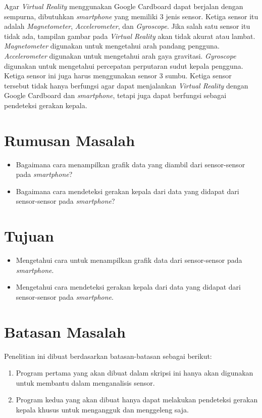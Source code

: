 Agar \textit{Virtual Reality} menggunakan Google Cardboard dapat berjalan dengan sempurna, dibutuhkan \textit{smartphone} yang memiliki 3 jenis sensor. Ketiga sensor itu adalah \textit{Magnetometer}, \textit{Accelerometer}, dan \textit{Gyroscope}.\cite{android_open_source_project} Jika salah satu sensor itu tidak ada, tampilan gambar pada \textit{Virtual Reality} akan tidak akurat atau lambat. \textit{Magnetometer} digunakan untuk mengetahui arah pandang pengguna. \textit{Accelerometer} digunakan untuk mengetahui arah gaya gravitasi.\cite{bleser2009advanced} \textit{Gyroscope} digunakan untuk mengetahui percepatan perputaran sudut kepala pengguna. Ketiga sensor ini juga harus menggunakan sensor 3 sumbu. Ketiga sensor tersebut tidak hanya berfungsi agar dapat menjalankan \textit{Virtual Reality} dengan Google Cardboard dan \textit{smartphone}, tetapi juga dapat berfungsi sebagai pendeteksi gerakan kepala.
\section{Rumusan Masalah}

\begin{itemize}
	\item Bagaimana cara menampilkan grafik data yang diambil dari sensor-sensor pada \textit{smartphone}?
	\item Bagaimana cara mendeteksi gerakan kepala dari data yang didapat dari sensor-sensor pada \textit{smartphone}?
\end{itemize}

\section{Tujuan}

\begin{itemize}
	\item Mengetahui cara untuk menampilkan grafik data dari sensor-sensor pada \textit{smartphone}.
	\item Mengetahui cara mendeteksi gerakan kepala dari data yang didapat dari sensor-sensor pada \textit{smartphone}.
\end{itemize}

\section{Batasan Masalah}

Penelitian ini dibuat berdasarkan batasan-batasan sebagai berikut: 
\begin{enumerate}
	\item Program pertama yang akan dibuat dalam skripsi ini hanya akan digunakan untuk membantu dalam menganalisis sensor.
	\item Program kedua yang akan dibuat hanya dapat melakukan pendeteksi gerakan kepala khusus untuk mengangguk dan menggeleng saja.
\end{enumerate}

